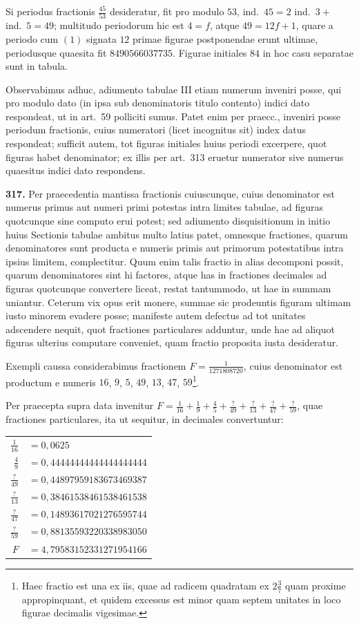 \documentclass[12pt,a4paper]{article}
\theoremstyle{plain}
\theoremstyle{definition}
\theoremstyle{remark}
\begin{document}
Si periodus fractionis $\frac{45}{53}$ desideratur, fit pro modulo $53$, ind.~$45 = 2$ ind.~$3 +$ ind.~$5 = 49$; multitudo periodorum hic est $4 = f$, atque $49 = 12f + 1$, quare a periodo cum $(1)$ signata $12$ primae figurae postponendae erunt ultimae, periodusque quaesita fit $8490566037735$. Figurae initiales $84$ in hoc casu separatae sunt in tabula.

Observabimus adhuc, adiumento tabulae III etiam numerum inveniri posse, qui pro modulo dato (in ipsa sub denominatoris titulo contento) indici dato respondeat, ut in art.~59 polliciti sumus. Patet enim per praecc., inveniri posse periodum fractionis, cuius numeratori (licet incognitus sit) index datus respondeat; sufficit autem, tot figuras initiales huius periodi excerpere, quot figuras habet denominator; ex illis per art.~313 eruetur numerator sive numerus quaesitus indici dato respondens.

\textbf{317.} Per praecedentia mantissa fractionis cuiuscunque, cuius denominator est numerus primus aut numeri primi potestas intra limites tabulae, ad figuras quotcunque sine computo erui potest; sed adiumento disquisitionum in initio huius Sectionis tabulae ambitus multo latius patet, omnesque fractiones, quarum denominatores sunt producta e numeris primis aut primorum potestatibus intra ipsius limitem, complectitur. Quum enim talis fractio in alias decomponi possit, quarum denominatores sint hi factores, atque has in fractiones decimales ad figuras quotcunque convertere liceat, restat tantummodo, ut hae in summam uniantur. Ceterum vix opus erit monere, summae sic prodeuntis figuram ultimam iusto minorem evadere posse; manifeste autem defectus ad tot unitates adscendere nequit, quot fractiones particulares adduntur, unde hae ad aliquot figuras ulterius computare conveniet, quam fractio proposita iusta desideratur.

Exempli caussa considerabimus fractionem $F = \frac{1}{1271808720}$, cuius denominator est productum e numeris $16$, $9$, $5$, $49$, $13$, $47$, $59$\footnote{Haec fractio est una ex iis, quae ad radicem quadratam ex $2\tfrac{3}{7}$ quam proxime appropinquant, et quidem excessus est minor quam septem unitates in loco figurae decimalis vigesimae.}.

Per praecepta supra data invenitur $F = \frac{1}{16} + \frac{1}{9} + \frac{4}{5} + \frac{?}{49} + \frac{?}{13} + \frac{?}{47} + \frac{?}{59}$, quae fractiones particulares, ita ut sequitur, in decimales convertuntur:

\begin{center}
\begin{tabular}{r@{\,}l}
$\frac{1}{16}$ & $= 0{,}0625$ \\
$\frac{4}{9}$ & $= 0{,}44444444444444444444$ \\
$\frac{?}{49}$ & $= 0{,}44897959183673469387$ \\
$\frac{?}{13}$ & $= 0{,}38461538461538461538$ \\
$\frac{?}{47}$ & $= 0{,}14893617021276595744$ \\
$\frac{?}{59}$ & $= 0{,}88135593220338983050$ \\
$F$ & $= 4{,}79583152331271954166$
\end{tabular}
\end{center}
\end{document}
